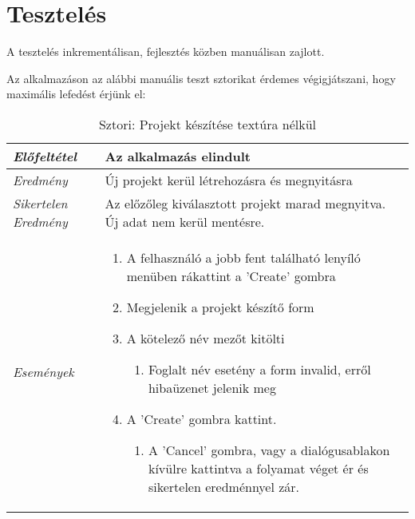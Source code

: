 \chapter{Tesztelés}
\label{ch:intro}

A tesztelés inkrementálisan, fejlesztés közben manuálisan zajlott.

Az alkalmazáson az alábbi manuális teszt sztorikat érdemes végigjátszani, hogy maximális lefedést érjünk el:

\begin{table}[H]
	\centering
	\begin{tabular}{ | m{} | m{} | }
		\hline
		\emph{Előfeltétel} & Az alkalmazás elindult  \\
		\hline
		\emph{Eredmény} & Új projekt kerül létrehozásra és megnyitásra  \\
		\hline
		\emph{Sikertelen Eredmény} & Az előzőleg kiválasztott projekt marad megnyitva. Új adat nem kerül mentésre.  \\
		\hline
		\emph{Események} &

		\begin{enumerate}
			\item A felhasználó a jobb fent található lenyíló menüben rákattint a 'Create' gombra
			\item Megjelenik a projekt készítő form
			\item A kötelező név mezőt kitölti
			\begin{enumerate}
				\item Foglalt név esetény a form invalid, erről hibaüzenet jelenik meg
			\end{enumerate}
			\item A 'Create' gombra kattint.
			\begin{enumerate}
				\item A 'Cancel' gombra, vagy a dialógusablakon kívülre kattintva a folyamat véget ér és sikertelen eredménnyel zár.
			\end{enumerate}
		\end{enumerate}

		\\
		\hline
	\end{tabular}
	\caption{Sztori: Projekt készítése textúra nélkül}
	\label{tab:story-project-create}
\end{table}

